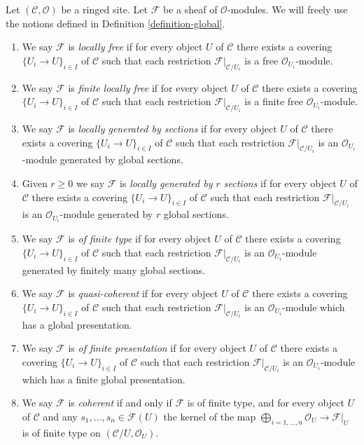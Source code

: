 \begin{definition}
\label{definition-site-local}
Let $(\mathcal{C}, \mathcal{O})$ be a ringed site.
Let $\mathcal{F}$ be a sheaf of $\mathcal{O}$-modules.
We will freely use the notions defined in
Definition \ref{definition-global}.
\begin{enumerate}
\item We say $\mathcal{F}$ is {\it locally free}
if for every object $U$ of $\mathcal{C}$ there exists a covering
$\{U_i \to U\}_{i \in I}$ of $\mathcal{C}$ such that each restriction
$\mathcal{F}|_{\mathcal{C}/U_i}$ is a free
$\mathcal{O}_{U_i}$-module.
\item We say $\mathcal{F}$ is {\it finite locally free}
if for every object $U$ of $\mathcal{C}$ there exists a covering
$\{U_i \to U\}_{i \in I}$ of $\mathcal{C}$ such that each restriction
$\mathcal{F}|_{\mathcal{C}/U_i}$ is a finite free
$\mathcal{O}_{U_i}$-module.
\item We say $\mathcal{F}$ is {\it locally generated by sections}
if for every object $U$ of $\mathcal{C}$ there exists a covering
$\{U_i \to U\}_{i \in I}$ of $\mathcal{C}$ such that each restriction
$\mathcal{F}|_{\mathcal{C}/U_i}$ is an
$\mathcal{O}_{U_i}$-module generated by global sections.
\item Given $r \geq 0$ we say $\mathcal{F}$ is {\it locally generated
by $r$ sections} if for every object $U$ of $\mathcal{C}$ there exists
a covering $\{U_i \to U\}_{i \in I}$ of $\mathcal{C}$ such that each
restriction $\mathcal{F}|_{\mathcal{C}/U_i}$ is an
$\mathcal{O}_{U_i}$-module generated by $r$ global sections.
\item We say $\mathcal{F}$ is {\it of finite type}
if for every object $U$ of $\mathcal{C}$ there exists a covering
$\{U_i \to U\}_{i \in I}$ of $\mathcal{C}$ such that each restriction
$\mathcal{F}|_{\mathcal{C}/U_i}$ is an
$\mathcal{O}_{U_i}$-module generated by finitely many global sections.
\item We say $\mathcal{F}$ is {\it quasi-coherent}
if for every object $U$ of $\mathcal{C}$ there exists a covering
$\{U_i \to U\}_{i \in I}$ of $\mathcal{C}$ such that each restriction
$\mathcal{F}|_{\mathcal{C}/U_i}$ is an
$\mathcal{O}_{U_i}$-module which has a global presentation.
\item We say $\mathcal{F}$ is {\it of finite presentation}
if for every object $U$ of $\mathcal{C}$ there exists a covering
$\{U_i \to U\}_{i \in I}$ of $\mathcal{C}$ such that each restriction
$\mathcal{F}|_{\mathcal{C}/U_i}$ is an
$\mathcal{O}_{U_i}$-module which has a finite global presentation.
\item We say $\mathcal{F}$ is {\it coherent} if and only if
$\mathcal{F}$ is of finite type, and for every object
$U$ of $\mathcal{C}$ and any $s_1, \ldots, s_n \in \mathcal{F}(U)$
the kernel of the map
$\bigoplus_{i = 1, \ldots, n} \mathcal{O}_U \to \mathcal{F}|_U$
is of finite type on $(\mathcal{C}/U, \mathcal{O}_U)$.
\end{enumerate}
\end{definition}

